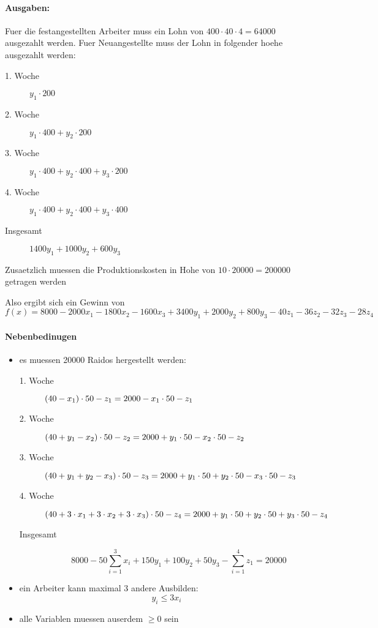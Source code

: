 \paragraph{Ausgaben:}
Fuer die festangestellten Arbeiter muss ein Lohn von $400 \cdot 40 \cdot 4 = 64000$ ausgezahlt werden.
Fuer Neuangestellte muss der Lohn in folgender hoehe ausgezahlt werden:
\begin{description}
\item[1. Woche] $y_1 \cdot 200$
\item[2. Woche] $y_1 \cdot 400 + y_2 \cdot 200$
\item[3. Woche] $y_1 \cdot 400 + y_2 \cdot 400 + y_3 \cdot 200$
\item[4. Woche] $y_1 \cdot 400 + y_2 \cdot 400 + y_3 \cdot 400$
\item[Insgesamt] $1400 y_1 + 1000 y_2 + 600 y_3$
\end{description}
Zusaetzlich muessen die Produktionskosten in Hohe von $10 \cdot 20000 = 200000$ getragen werden

Also ergibt sich ein Gewinn von 
\begin{equation}
f(x) = 
    8000 - 2000 x_1 - 1800 x_2 - 1600 x_3 + 3400 y_1 + 2000 y_2 + 800 y_3 - 40 z_1 - 36 z_2 - 32 z_3 - 28 z_4
\end{equation}

\paragraph{Nebenbedinugen}
\begin{itemize}
\item es muessen 20000 Raidos hergestellt werden:
    \begin{description}
    \item[1. Woche] $(40 - x_1) \cdot 50 -z_1\\= 
        2000 - x_1 \cdot 50 - z_1$
    \item[2. Woche] $(40 + y_1 - x_2) \cdot 50 -z_2\\= 
        2000 + y_1 \cdot 50 - x_2 \cdot 50 - z_2$
    \item[3. Woche] $(40 + y_1 + y_2 - x_3) \cdot 50 -z_3\\= 
        2000 + y_1 \cdot 50 + y_2 \cdot 50 - x_3 \cdot 50 - z_3$
    \item[4. Woche] $(40 + 3\cdot x_1 + 3\cdot x_2 + 3\cdot x_3) \cdot 50 - z_4\\= 
        2000 + y_1 \cdot 50 + y_2 \cdot 50 + y_3 \cdot 50 - z_4$
    \item[Insgesamt] 
    \begin{equation}
        8000 - 50 \sum_{i=1}^3 x_i + 150 y_1 + 100 y_2 + 50 y_3 - \sum_{i=1}^4 z_1 = 20000
    \end{equation}
    \end{description}
\item ein Arbeiter kann maximal 3 andere Ausbilden:
    \begin{equation}
    y_i \leq 3 x_i
    \end{equation}

\item alle Variablen muessen auserdem $\geq 0$ sein

\end{itemize}

